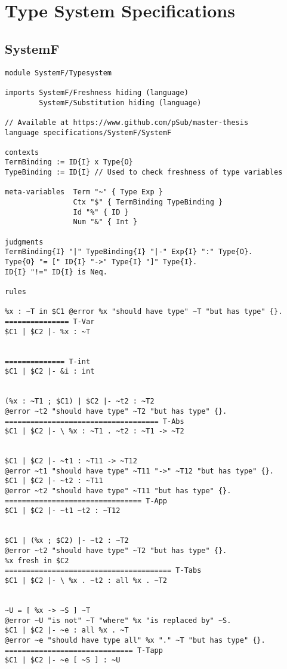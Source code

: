 \chapter{Type System Specifications}
\section{SystemF}
\label{appendix:systemf}
\begin{lstlisting}[language=sltc]
module SystemF/Typesystem

imports SystemF/Freshness hiding (language)
        SystemF/Substitution hiding (language)

// Available at https://www.github.com/pSub/master-thesis
language specifications/SystemF/SystemF

contexts
TermBinding := ID{I} x Type{O}
TypeBinding := ID{I} // Used to check freshness of type variables

meta-variables  Term "~" { Type Exp }
                Ctx "$" { TermBinding TypeBinding }
                Id "%" { ID }
                Num "&" { Int }

judgments
TermBinding{I} "|" TypeBinding{I} "|-" Exp{I} ":" Type{O}.
Type{O} "= [" ID{I} "->" Type{I} "]" Type{I}.
ID{I} "!=" ID{I} is Neq.

rules

%x : ~T in $C1 @error %x "should have type" ~T "but has type" {}.
=============== T-Var
$C1 | $C2 |- %x : ~T


============== T-int
$C1 | $C2 |- &i : int


(%x : ~T1 ; $C1) | $C2 |- ~t2 : ~T2
@error ~t2 "should have type" ~T2 "but has type" {}.
==================================== T-Abs
$C1 | $C2 |- \ %x : ~T1 . ~t2 : ~T1 -> ~T2


$C1 | $C2 |- ~t1 : ~T11 -> ~T12
@error ~t1 "should have type" ~T11 "->" ~T12 "but has type" {}.
$C1 | $C2 |- ~t2 : ~T11
@error ~t2 "should have type" ~T11 "but has type" {}.
================================ T-App
$C1 | $C2 |- ~t1 ~t2 : ~T12


$C1 | (%x ; $C2) |- ~t2 : ~T2
@error ~t2 "should have type" ~T2 "but has type" {}.
%x fresh in $C2
======================================= T-Tabs
$C1 | $C2 |- \ %x . ~t2 : all %x . ~T2


~U = [ %x -> ~S ] ~T 
@error ~U "is not" ~T "where" %x "is replaced by" ~S.
$C1 | $C2 |- ~e : all %x . ~T
@error ~e "should have type all" %x "." ~T "but has type" {}.
============================== T-Tapp
$C1 | $C2 |- ~e [ ~S ] : ~U
\end{lstlisting}
